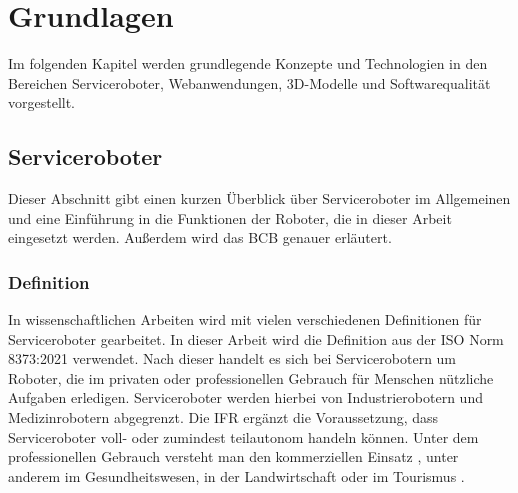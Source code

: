 \newpage
\section{Grundlagen}\label{Grundlagen}
Im folgenden Kapitel werden grundlegende Konzepte und Technologien in den Bereichen Serviceroboter, Webanwendungen, 3D-Modelle und Softwarequalität vorgestellt.

\subsection{Serviceroboter}
Dieser Abschnitt gibt einen kurzen Überblick über Serviceroboter im Allgemeinen und eine Einführung in die Funktionen der Roboter, die in dieser Arbeit eingesetzt werden. Außerdem wird das \ac{BCB} genauer erläutert.

\subsubsection{Definition}
In wissenschaftlichen Arbeiten wird mit vielen verschiedenen Definitionen für Serviceroboter gearbeitet. In dieser Arbeit wird die Definition aus der ISO Norm 8373:2021 \cite[Kap.~3]{ISO2021} verwendet. Nach dieser handelt es sich bei Servicerobotern um Roboter, die im privaten oder professionellen Gebrauch für Menschen nützliche Aufgaben erledigen. Serviceroboter werden hierbei von Industrierobotern und Medizinrobotern abgegrenzt. Die \ac{IFR} \cite{IFR2024} ergänzt die Voraussetzung, dass Serviceroboter voll- oder zumindest teilautonom handeln können. Unter dem professionellen Gebrauch versteht man den kommerziellen Einsatz \cite[S.~4]{GonzalezAguirre2021}, unter anderem im Gesundheitswesen, in der Landwirtschaft oder im Tourismus \cite[S.~9]{GonzalezAguirre2021}.

